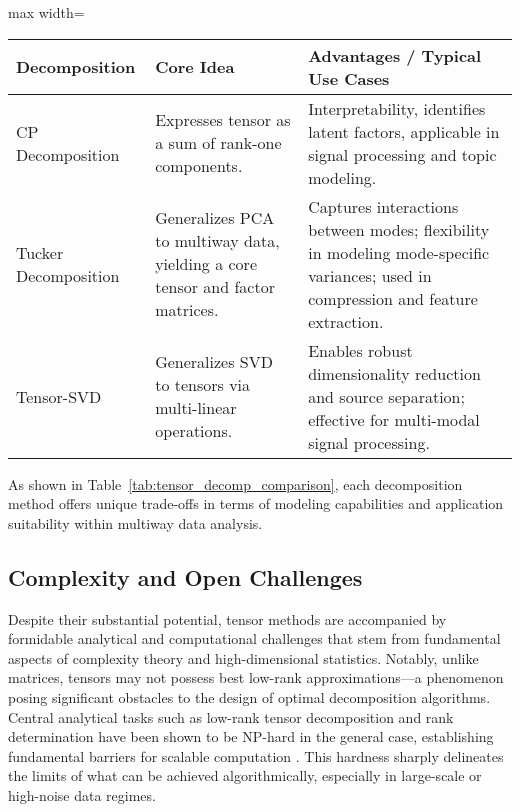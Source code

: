 \begin{table*}[htbp]
\centering
\caption{Comparison of Core Tensor Decomposition Techniques}
\label{tab:tensor_decomp_comparison}
\begin{adjustbox}{max width=\textwidth}
\begin{tabular}{lll}
\toprule
\textbf{Decomposition} & \textbf{Core Idea} & \textbf{Advantages / Typical Use Cases} \\
\midrule
CP Decomposition & Expresses tensor as a sum of rank-one components. & Interpretability, identifies latent factors, applicable in signal processing and topic modeling. \\
Tucker Decomposition & Generalizes PCA to multiway data, yielding a core tensor and factor matrices. & Captures interactions between modes; flexibility in modeling mode-specific variances; used in compression and feature extraction. \\
Tensor-SVD & Generalizes SVD to tensors via multi-linear operations. & Enables robust dimensionality reduction and source separation; effective for multi-modal signal processing. \\
\bottomrule
\end{tabular}
\end{adjustbox}
\end{table*}

As shown in Table~\ref{tab:tensor_decomp_comparison}, each decomposition method offers unique trade-offs in terms of modeling capabilities and application suitability within multiway data analysis.

\subsection{Complexity and Open Challenges}

Despite their substantial potential, tensor methods are accompanied by formidable analytical and computational challenges that stem from fundamental aspects of complexity theory and high-dimensional statistics. Notably, unlike matrices, tensors may not possess best low-rank approximations—a phenomenon posing significant obstacles to the design of optimal decomposition algorithms. Central analytical tasks such as low-rank tensor decomposition and rank determination have been shown to be NP-hard in the general case, establishing fundamental barriers for scalable computation \cite{ref104}. This hardness sharply delineates the limits of what can be achieved algorithmically, especially in large-scale or high-noise data regimes.

